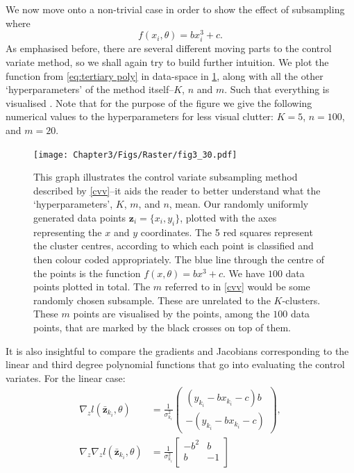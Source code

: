 We now move onto a non-trivial case in order to show the effect of subsampling where
%
\begin{equation}
    f(x_i,\theta) = bx_i^3+ c.
\label{eq:tertiary poly}
\end{equation}
%
As emphasised before, there are several different moving parts to the control variate method, so we shall again try to build further intuition. We plot the function from \cref{eq:tertiary poly} in data-space in \cref{fig:three}, along with all the other `hyperparameters' of the method itself--$K$, $n$ and $m$. Such that everything is visualised . Note that for the purpose of the figure we give the following numerical values to the hyperparameters for less visual clutter: $K=5$, $n=100$, and $m=20$.
%
\begin{figure} 
\centering    
\texttt{[image: Chapter3/Figs/Raster/fig3\_30.pdf]}
\caption{ This graph illustrates the control variate subsampling method described by \cref{cvv}--it aids the reader to better understand what the `hyperparameters', $K$, $m$, and $n$, mean. Our randomly uniformly generated data points $\textbf{z}_i= \{x_i,y_i \}$, plotted with the axes representing the $x$ and $y$ coordinates. The 5 red squares represent the cluster centres, according to which each point is classified and then colour coded appropriately. The blue line through the centre of the points is the function $f(x,\theta)= bx^3+c$. We have $100$ data points plotted in total. The $m$ referred to in \cref{cvv} would be some randomly chosen subsample. These are unrelated to the $K$-clusters. These $m$ points are visualised by the points, among the $100$ data points, that are marked by the black crosses on top of them.}
\label{fig:three}
\end{figure}
%
It is also insightful to compare the gradients and Jacobians corresponding to the linear and third degree polynomial functions that go into evaluating the control variates. For the linear case:
%
\begin{align}
   \nabla_z l(\bar{\textbf{z}}_{k_{i}},\theta) &= \frac{1}{\sigma_{k_{i}}^2} \begin{pmatrix}(y_{k_{i}}-bx_{k_{i}}-c)b\\-(y_{k_{i}}-bx_{k_{i}}-c)\end{pmatrix},\\
   \nabla_z \nabla_z l(\bar{\textbf{z}}_{k_{i}},\theta) &=  \frac{1}{\sigma_{k_{i}}^2} \begin{bmatrix}
-b^2 & b \\
b & -1 \\
\end{bmatrix}
\end{align}
